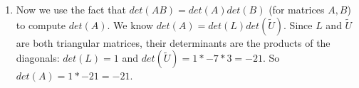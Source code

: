 \documentclass[11pt]{article}
\begin{document}
\begin{exercise}{3}
{\begin{enumerate}[label=(\alph*)]
$$\begin{bmatrix}
                4 & 1 & 0 \\
                2 & 1 & 1
            \end{bmatrix}
            \begin{bmatrix}
                1 & 0 & 0 \\
                0 & -7 & 0 \\
                0 & 0 & 3
            \end{bmatrix}
            \begin{bmatrix}
                1 & 4 & 1 \\
                0 & 1 & 3/7 \\
                0 & 0 & 1
            \end{bmatrix} $$
            \item Now we use the fact that $det(AB) = det(A) det(B)$ (for matrices $A, B$) to compute $det(A)$.
            We know $det(A) = det(L) det(\tilde{U})$.
            Since $L$ and $\tilde{U}$ are both triangular matrices, their determinants are the products of the diagonals: $det(L) = 1$ and $det(\tilde{U}) = 1 * -7 * 3 = -21$.
            So $det(A) = 1 * -21 = -21$.
        \end{enumerate}
    }
\end{exercise}

\end{document}
